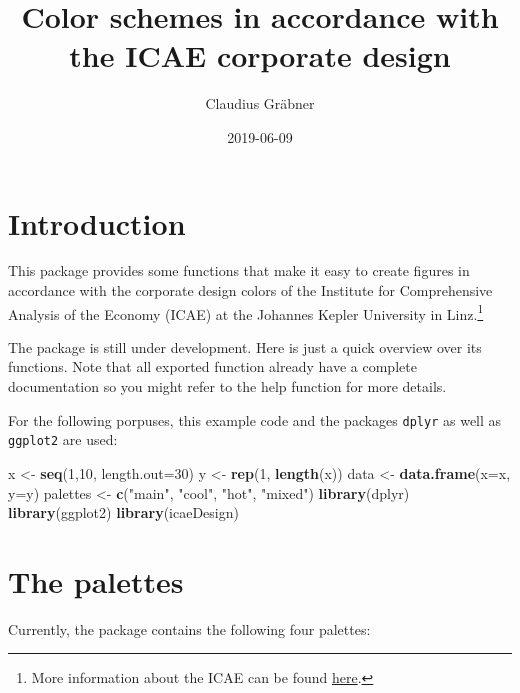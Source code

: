\documentclass[]{article}
\title{Color schemes in accordance with the ICAE corporate design}
\author{Claudius Gräbner}
\date{2019-06-09}
\newenvironment{Shaded}{\begin{snugshade}}{\end{snugshade}}
\newcommand{\KeywordTok}[1]{\textcolor[rgb]{0.13,0.29,0.53}{\textbf{#1}}}
\newcommand{\DataTypeTok}[1]{\textcolor[rgb]{0.13,0.29,0.53}{#1}}
\newcommand{\DecValTok}[1]{\textcolor[rgb]{0.00,0.00,0.81}{#1}}
\newcommand{\StringTok}[1]{\textcolor[rgb]{0.31,0.60,0.02}{#1}}
\newcommand{\NormalTok}[1]{#1}
\let\rmarkdownfootnote\footnote%
\def\footnote{\protect\rmarkdownfootnote}
\begin{document}
\maketitle

\section{Introduction}\label{introduction}

This package provides some functions that make it easy to create figures
in accordance with the corporate design colors of the Institute for
Comprehensive Analysis of the Economy (ICAE) at the Johannes Kepler
University in Linz.\footnote{More information about the ICAE can be
  found
  \href{https://www.jku.at/en/institute-for-comprehensive-analysis-of-the-economy/}{here}.}

The package is still under development. Here is just a quick overview
over its functions. Note that all exported function already have a
complete documentation so you might refer to the help function for more
details.

For the following porpuses, this example code and the packages
\texttt{dplyr} as well as \texttt{ggplot2} are used:

\begin{Shaded}
\begin{Highlighting}[]
\NormalTok{x <-}\StringTok{ }\KeywordTok{seq}\NormalTok{(}\DecValTok{1}\NormalTok{,}\DecValTok{10}\NormalTok{, }\DataTypeTok{length.out=}\DecValTok{30}\NormalTok{)}
\NormalTok{y <-}\StringTok{ }\KeywordTok{rep}\NormalTok{(}\DecValTok{1}\NormalTok{, }\KeywordTok{length}\NormalTok{(x))}
\NormalTok{data <-}\StringTok{ }\KeywordTok{data.frame}\NormalTok{(}\DataTypeTok{x=}\NormalTok{x, }\DataTypeTok{y=}\NormalTok{y)}
\NormalTok{palettes <-}\StringTok{ }\KeywordTok{c}\NormalTok{(}\StringTok{"main"}\NormalTok{, }\StringTok{"cool"}\NormalTok{, }\StringTok{"hot"}\NormalTok{, }\StringTok{"mixed"}\NormalTok{)}
\KeywordTok{library}\NormalTok{(dplyr)}
\KeywordTok{library}\NormalTok{(ggplot2)}
\KeywordTok{library}\NormalTok{(icaeDesign)}
\end{Highlighting}
\end{Shaded}

\section{The palettes}\label{the-palettes}

Currently, the package contains the following four palettes:
\end{document}
